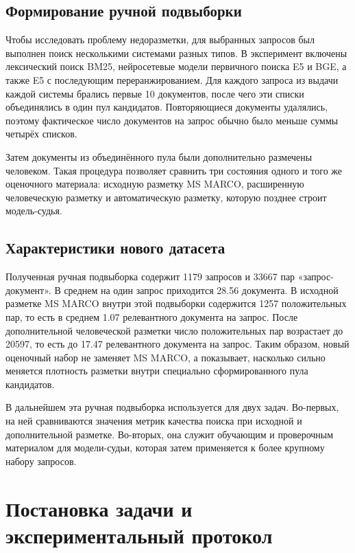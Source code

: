 \documentclass[10pt,a4paper,twocolumn]{article}
\begin{document}
\subsection{Формирование ручной подвыборки}

Чтобы исследовать проблему недоразметки, для выбранных запросов был выполнен поиск несколькими системами разных типов. В эксперимент включены лексический поиск BM25, нейросетевые модели первичного поиска E5 и BGE, а также E5 с последующим переранжированием. Для каждого запроса из выдачи каждой системы брались первые 10 документов, после чего эти списки объединялись в один пул кандидатов. Повторяющиеся документы удалялись, поэтому фактическое число документов на запрос обычно было меньше суммы четырёх списков.

Затем документы из объединённого пула были дополнительно размечены человеком. Такая процедура позволяет сравнить три состояния одного и того же оценочного материала: исходную разметку MS MARCO, расширенную человеческую разметку и автоматическую разметку, которую позднее строит модель-судья.

\subsection{Характеристики нового датасета}

Полученная ручная подвыборка содержит 1179 запросов и 33667 пар «запрос-документ». В среднем на один запрос приходится 28.56 документа. В исходной разметке MS MARCO внутри этой подвыборки содержится 1257 положительных пар, то есть в среднем 1.07 релевантного документа на запрос. После дополнительной человеческой разметки число положительных пар возрастает до 20597, то есть до 17.47 релевантного документа на запрос. Таким образом, новый оценочный набор не заменяет MS MARCO, а показывает, насколько сильно меняется плотность разметки внутри специально сформированного пула кандидатов.

В дальнейшем эта ручная подвыборка используется для двух задач. Во-первых, на ней сравниваются значения метрик качества поиска при исходной и дополнительной разметке. Во-вторых, она служит обучающим и проверочным материалом для модели-судьи, которая затем применяется к более крупному набору запросов.

\section{Постановка задачи и экспериментальный протокол}
\end{document}
